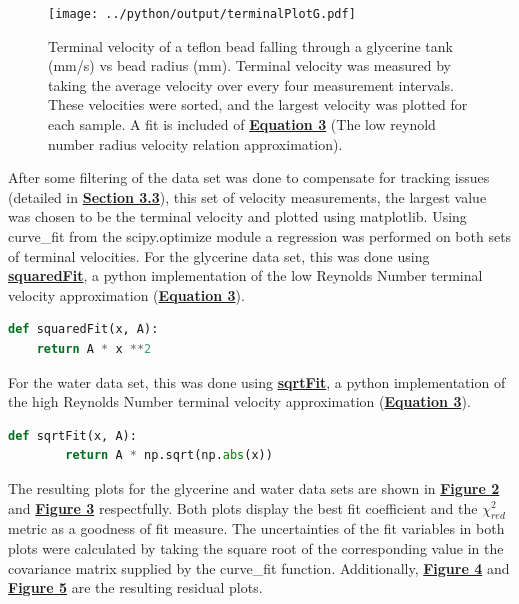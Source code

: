 \documentclass[
	letterpaper
	12pt
]{template}
\newcommand{\bref}[2]{\textbf{\hyperref[#1]{#2}}}
\begin{document}
\begin{figure}\label{fig::terminalPlotG}
	\vspace{-30pt}
	\centering
	\texttt{[image: ../python/output/terminalPlotG.pdf]}
	\caption{Terminal velocity of a teflon bead falling through a glycerine tank (mm/s) vs bead radius (mm). Terminal velocity was measured by taking the average velocity over every four measurement intervals. These velocities were sorted, and the largest velocity was plotted for each sample. A fit is included of \bref{eqn::terminalVelocity}{Equation 3} (The low reynold number radius velocity relation approximation).}
	\vspace{-50pt}
\end{figure}
After some filtering of the data set was done to compensate for tracking issues (detailed in \bref{sec::filtering}{Section 3.3}), this set of velocity measurements, the largest value was chosen to be the terminal velocity and plotted using matplotlib. Using curve\_fit from the scipy.optimize module a regression was performed on both sets of terminal velocities. For the glycerine data set, this was done using \bref{fnc::squaredFit}{squaredFit}, a python implementation of the low Reynolds Number terminal velocity approximation (\bref{eqn::terminalVelocity}{Equation 3}).

\begin{lstlisting}[label={fnc::squaredFit},captionpos=b,language=python]
def squaredFit(x, A):
	return A * x **2
\end{lstlisting}

For the water data set, this was done using \bref{fnc::sqrtFit}{sqrtFit}, a python implementation of the high Reynolds Number terminal velocity approximation (\bref{eqn::terminalVelocity}{Equation 3}).\vspace{0pt}

\begin{lstlisting}[label={fnc::sqrtFit}, captionpos=b,language=python]
	def sqrtFit(x, A):
		return A * np.sqrt(np.abs(x))
\end{lstlisting}

The resulting plots for the glycerine and water data sets are shown in \bref{fig::terminalPlotG}{Figure 2} and \bref{fig::terminalPlotW}{Figure 3} respectfully. Both plots display the best fit coefficient and the $\chi_{red}^2$ metric as a goodness of fit measure. The uncertainties of the fit variables in both plots were calculated by taking the square root of the corresponding value in the covariance matrix supplied by the curve\_fit function. Additionally, \bref{fig::terminalPlotGRes}{Figure 4} and \bref{fig::terminalPlotWRes}{Figure 5} are the resulting residual plots.
\end{document}
